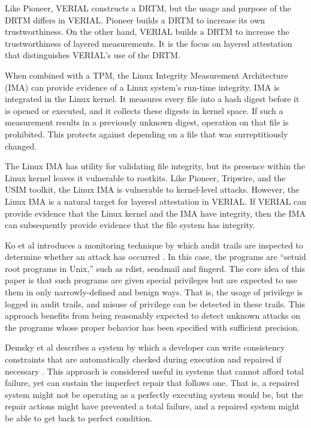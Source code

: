 \documentclass[a4paper,twoside]{article}
\begin{document}
Like Pioneer, VERIAL constructs a DRTM, but the usage and purpose of the DRTM differs in VERIAL. Pioneer builds a DRTM to increase its own trustworthiness. On the other hand, VERIAL builds a DRTM to increase the trustworthiness of layered measurements. It is the focus on layered attestation that distinguishes VERIAL's use of the DRTM.

When combined with a TPM, the Linux Integrity Measurement Architecture (IMA) can provide evidence of a Linux system's run-time integrity. IMA is integrated in the Linux kernel. It measures every file into a hash digest before it is opened or executed, and it collects these digests in kernel space. If such a measurement results in a previously unknown digest, operation on that file is prohibited. This protects against depending on a file that was surreptitiously changed.

The Linux IMA has utility for validating file integrity, but its presence within the Linux kernel leaves it vulnerable to rootkits. Like Pioneer, Tripwire, and the USIM toolkit, the Linux IMA is vulnerable to kernel-level attacks. However, the Linux IMA is a natural target for layered attestation in VERIAL. If VERIAL can provide evidence that the Linux kernel and the IMA have integrity, then the IMA can subsequently provide evidence that the file system has integrity.

Ko et al introduces a monitoring technique by which audit trails are inspected to determine whether an attack has occurred \cite{DetPriv}. In this case, the programs are ``setuid root programs in Unix,'' such as rdist, sendmail and fingerd. The core idea of this paper is that such programs are given special privileges but are expected to use them in only narrowly-defined and benign ways. That is, the usage of privilege is logged in audit trails, and misuse of privilege can be detected in these trails. This approach benefits from being reasonably expected to detect unknown attacks on the programs whose proper behavior has been specified with sufficient precision.

Demsky et al describes a system by which a developer can write consistency constraints that are automatically checked during execution and repaired if necessary \cite{AutoRepair}. This approach is considered useful in systems that cannot afford total failure, yet can sustain the imperfect repair that follows one. That is, a repaired system might not be operating as a perfectly executing system would be, but the repair actions might have prevented a total failure, and a repaired system might be able to get back to perfect condition.
\end{document}
